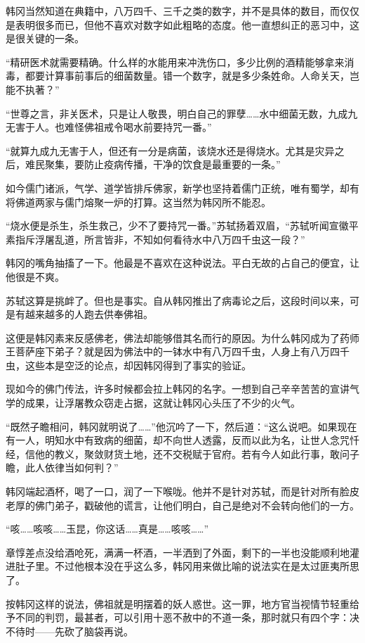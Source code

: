 韩冈当然知道在典籍中，八万四千、三千之类的数字，并不是具体的数目，而仅仅是表明很多而已，但他不喜欢对数字如此粗略的态度。他一直想纠正的恶习中，这是很关键的一条。

“精研医术就需要精确。什么样的水能用来冲洗伤口，多少比例的酒精能够拿来消毒，都要计算事前事后的细菌数量。错一个数字，就是多少条姓命。人命关天，岂能不执著？”

“世尊之言，非关医术，只是让人敬畏，明白自己的罪孽……水中细菌无数，九成九无害于人。也难怪佛祖戒令喝水前要持咒一番。”

“就算九成九无害于人，但还有一分是病菌，该烧水还是得烧水。尤其是灾异之后，难民聚集，要防止疫病传播，干净的饮食是最重要的一条。”

如今儒门诸派，气学、道学皆排斥佛家，新学也坚持着儒门正统，唯有蜀学，却有将佛道两家与儒门熔聚一炉的打算。这当然为韩冈所不能忍。

“烧水便是杀生，杀生救己，少不了要持咒一番。”苏轼扬着双眉，“苏轼听闻宣徽平素指斥浮屠乱道，所言皆非，不知如何看待水中八万四千虫这一段？”

韩冈的嘴角抽搐了一下。他最是不喜欢在这种说法。平白无故的占自己的便宜，让他很是不爽。

苏轼这算是挑衅了。但也是事实。自从韩冈推出了病毒论之后，这段时间以来，可是有越来越多的人跑去供奉佛祖。

这便是韩冈素来反感佛老，佛法却能够借其名而行的原因。为什么韩冈成为了药师王菩萨座下弟子？就是因为佛法中的一钵水中有八万四千虫，人身上有八万四千虫，这些本是空泛的论点，却因韩冈得到了事实的验证。

现如今的佛门传法，许多时候都会拉上韩冈的名字。一想到自己辛辛苦苦的宣讲气学的成果，让浮屠教众窃走占据，这就让韩冈心头压了不少的火气。

“既然子瞻相问，韩冈就明说了……”他沉吟了一下，然后道：“这么说吧。如果现在有一人，明知水中有致病的细菌，却不向世人透露，反而以此为名，让世人念咒忏经，信他的教义，聚敛财货土地，还不交税赋于官府。若有今人如此行事，敢问子瞻，此人依律当如何判？”

韩冈端起酒杯，喝了一口，润了一下喉咙。他并不是针对苏轼，而是针对所有脸皮老厚的佛门弟子，戳破他的谎言，让他们明白，自己是绝对不会转向他们的一方。

“咳……咳咳……玉昆，你这话……真是……咳咳……”

章惇差点没给酒呛死，满满一杯酒，一半洒到了外面，剩下的一半也没能顺利地灌进肚子里。不过他根本没在乎这么多，韩冈用来做比喻的说法实在是太过匪夷所思了。

按韩冈这样的说法，佛祖就是明摆着的妖人惑世。这一罪，地方官当视情节轻重给予不同的判罚，最甚者，可以引用十恶不赦中的不道一条，那时就只有四个字：决不待时——先砍了脑袋再说。

